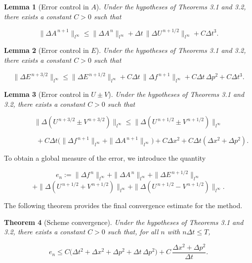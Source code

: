 \documentclass[11pt,a4paper,twoside,pdf]{article}
\numberwithin{equation}{section}
\newtheorem{theorem}{Theorem}[section]
\newtheorem{lemma}[theorem]{Lemma}
\begin{document}
\begin{lemma}[Error control in $A$]
Under the hypotheses of Theorems 3.1 and 3.2, there exists a constant $C>0$ such that


\[
\|\Delta A^{\,n+1}\|_{l^\infty}
\le \|\Delta A^{\,n}\|_{l^\infty}
+ \Delta t\,\|\Delta U^{\,n+1/2}\|_{l^\infty}
+ C\Delta t^3.
\]


\end{lemma}



\begin{lemma}[Error control in $E$]
Under the hypotheses of Theorems 3.1 and 3.2, there exists a constant $C>0$ such that


\[
\|\Delta E^{\,n+3/2}\|_{l^\infty}
\le \|\Delta E^{\,n+1/2}\|_{l^\infty}
+ C\Delta t\,\|\Delta f^{\,n+1}\|_{l^\infty}
+ C\Delta t\,\Delta p^2
+ C\Delta t^3.
\]


\end{lemma}


\begin{lemma}[Error control in $U\pm V$]
Under the hypotheses of Theorems 3.1 and 3.2, there exists a constant $C>0$ such that


\[
\|\Delta(U^{\,n+3/2} \pm V^{\,n+3/2})\|_{l^\infty}
\le
\|\Delta(U^{\,n+1/2} \pm V^{\,n+1/2})\|_{l^\infty}
\]




\[
\qquad\qquad
+ C\Delta t\big(\|\Delta f^{\,n+1}\|_{l^\infty}
+ \|\Delta A^{\,n+1}\|_{l^\infty}\big)
+ C\Delta x^2
+ C\Delta t(\Delta x^2 + \Delta p^2).
\]


\end{lemma}



To obtain a global measure of the error, we introduce the quantity


\[
e_n :=
\|\Delta f^{\,n}\|_{l^\infty}
+ \|\Delta A^{\,n}\|_{l^\infty}
+ \|\Delta E^{\,n+1/2}\|_{l^\infty}
\]
\[
+ \|\Delta(U^{\,n+1/2}+V^{\,n+1/2})\|_{l^\infty}
+ \|\Delta(U^{\,n+1/2}-V^{\,n+1/2})\|_{l^\infty}.
\]



The following theorem provides the final convergence estimate for the method.

\begin{theorem}[Scheme convergence]
Under the hypotheses of Theorems 3.1 and 3.2, there exists a constant $C>0$ such that, for all $n$ with $n\Delta t\le T$,


\[
e_n \le
C\big(\Delta t^2 + \Delta x^2 + \Delta p^2 + \Delta t\,\Delta p^2\big)
+ C\,\frac{\Delta x^2 + \Delta p^2}{\Delta t}.
\]


\end{theorem}
\end{document}
